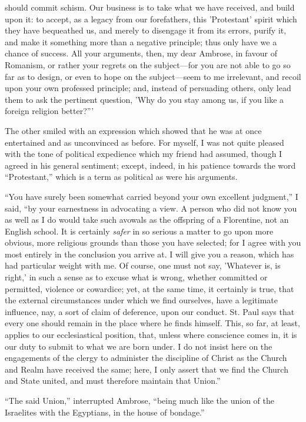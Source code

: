 should commit schism. Our business is to take what we have received,
and build upon it: to accept, as a legacy from our forefathers, this
'Protestant' spirit which they have bequeathed us, and merely to
disengage it from its errors, purify it, and make it something more
than a negative principle; thus only have we a chance of success. All
your arguments, then, my dear Ambrose, in favour of Romanism, or
rather your regrets on the subject—for you are not able to go so far
as to design, or even to hope on the subject—seem to me irrelevant,
and recoil upon your own professed principle; and, instead of
persuading others, only lead them to ask the pertinent question, 'Why
do you stay among us, if you like a foreign religion better?'''

The other smiled with an expression which showed
that he was at once entertained and as unconvinced as before. For
myself, I was not quite pleased with the tone of political expedience
which my friend had assumed, though I agreed in his general sentiment;
except, indeed, in his patience towards the word ``Protestant,'' which
is a term as political as were his arguments.

``You have surely been somewhat carried beyond
your own excellent judgment,'' I said, ``by your earnestness in
advocating a view. A person who did not know you as well as I do would
take such avowals as the offspring of a Florentine, not an
English school. It is certainly \emph{safer} in so serious a matter to
go upon more obvious, more religious grounds than those you have
selected; for I agree with you most entirely in the conclusion you
arrive at. I will give you a reason, which has had particular weight
with me. Of course, one must not say, 'Whatever is, is right,' in such
a sense as to excuse what is wrong, whether committed or permitted,
violence or cowardice; yet, at the same time, it certainly is true,
that the external circumstances under which we find ourselves, have a
legitimate influence, nay, a sort of claim of deference, upon our
conduct. St. Paul says that every one should remain in the place where
he finds himself. This, so far, at least, applies to our
ecclesiastical position, that, unless where conscience comes in, it is
our duty to submit to what we are born under. I do not insist here on
the engagements of the clergy to administer the discipline of Christ
as the Church and Realm have received the same; here, I only assert
that we find the Church and State united, and must therefore maintain
that Union.''

``The said Union,'' interrupted Ambrose, ``being
much like the union of the Israelites with the Egyptians, in the house
of bondage.''

